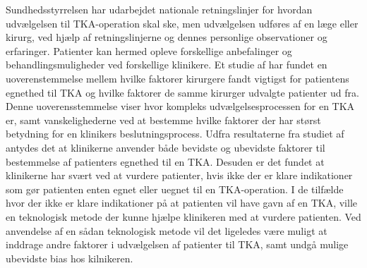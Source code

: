 Sundhedsstyrrelsen har udarbejdet nationale retningslinjer for hvordan udvælgelsen til TKA-operation skal ske, men udvælgelsen udføres af en læge eller kirurg, ved hjælp af retningslinjerne og dennes personlige observationer og erfaringer. Patienter kan hermed opleve forskellige anbefalinger og behandlingsmuligheder ved forskellige klinikere. 
Et studie af  har fundet en uoverenstemmelse mellem hvilke faktorer kirurgere fandt vigtigst for patientens egnethed til TKA og hvilke faktorer de samme kirurger udvalgte patienter ud fra. Denne uoverensstemmelse viser hvor kompleks udvælgelsesprocessen for en TKA er, samt vanskelighederne ved at bestemme hvilke faktorer der har størst betydning for en klinikers beslutningsprocess. Udfra resultaterne fra studiet af  antydes det at klinikerne anvender både bevidste og ubevidste faktorer til bestemmelse af patienters egnethed til en TKA. Desuden er det fundet at klinikerne har svært ved at vurdere patienter, hvis ikke der er klare indikationer som gør patienten enten egnet eller uegnet til en TKA-operation. 
I de tilfælde hvor der ikke er klare indikationer på at patienten vil have gavn af en TKA, ville en teknologisk metode der kunne hjælpe klinikeren med at vurdere patienten. Ved anvendelse af en sådan teknologisk metode vil det ligeledes være muligt at inddrage andre faktorer i udvælgelsen af patienter til TKA, samt undgå mulige ubevidste bias hos kilnikeren. 

